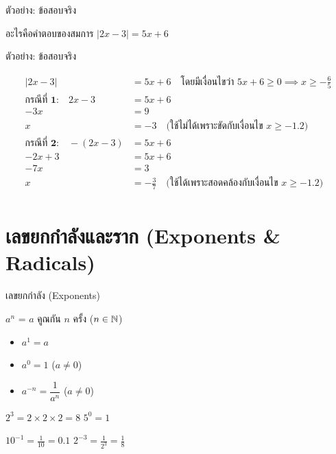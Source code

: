\documentclass[11pt, aspectratio=169]{beamer}
\begin{document}
\begin{frame}{ตัวอย่าง: ข้อสอบจริง}
  \begin{exambox}[ข้อสอบจริงปี 68 ข้อ 14]
    อะไรคือคำตอบของสมการ $\left\lvert 2x-3\right\rvert = 5x+6$
  \end{exambox}
\end{frame}

\begin{frame}{ตัวอย่าง: ข้อสอบจริง}
  \begin{solbox}
    \begin{align*}
      |2x-3| &= 5x+6 \quad \text{โดยมีเงื่อนไขว่า } 5x+6 \geq 0 \implies x \geq -\frac{6}{5} \\
      \textbf{กรณีที่ 1:} \quad 2x-3 &= 5x+6 \\
      -3x &= 9 \\
      x &= -3 \quad \text{(ใช้ไม่ได้เพราะขัดกับเงื่อนไข } x \geq -1.2\text{)} \\
      \textbf{กรณีที่ 2:} \quad -(2x-3) &= 5x+6 \\
      -2x+3 &= 5x+6 \\
      -7x &= 3 \\
      x &= -\frac{3}{7} \quad \text{(ใช้ได้เพราะสอดคล้องกับเงื่อนไข } x \geq -1.2\text{)} \\
    \end{align*}
  \end{solbox}
\end{frame}
\section{เลขยกกำลังและราก (Exponents \& Radicals)}

\begin{frame}{เลขยกกำลัง (Exponents)}
  \begin{explanation}[นิยาม]
    $a^n$ = $a$ คูณกัน $n$ ครั้ง \quad ($n \in \mathbb{N}$)

    \medskip
    \begin{itemize}
      \item $a^1 = a$
      \item $a^0 = 1$ \quad ($a \neq 0$)
      \item $a^{-n} = \dfrac{1}{a^n}$ \quad ($a \neq 0$)
    \end{itemize}
  \end{explanation}

  \begin{exambox}[ตัวอย่าง]
    $2^3 = 2 \times 2 \times 2 = 8$ \qquad
    $5^0 = 1$

    $10^{-1} = \frac{1}{10} = 0.1$ \qquad
    $2^{-3} = \frac{1}{2^3} = \frac{1}{8}$
  \end{exambox}
\end{frame}
\end{document}
